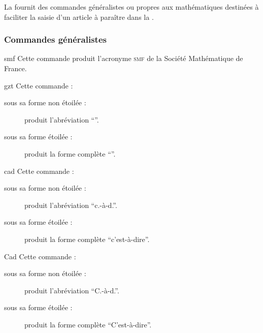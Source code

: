 La \gztauthorcl{} fournit des commandes généralistes ou propres aux
mathématiques destinées à faciliter la saisie d'un article à paraître dans la
\gzt{}.

\subsubsection{Commandes généralistes}
\label{sec:comm-gener}

\begin{docCommand}{smf}{}
  Cette commande produit l'acronyme \textsc{smf} de la Société Mathématique de
  France.
\end{docCommand}

\begin{docCommand}{gzt}{}
  Cette commande :
  \begin{description}
  \item[sous sa forme non étoilée :] produit l'abréviation \enquote{\gzt}.
  \item[sous sa forme étoilée :] produit la forme complète \enquote{\gzt*}.
  \end{description}
\end{docCommand}

\begin{docCommand}{cad}{}
  Cette commande :
  \begin{description}
  \item[sous sa forme non étoilée :] produit l'abréviation \enquote{c.-à-d.}.
  \item[sous sa forme étoilée :] produit la forme complète
    \enquote{c'est-à-dire}.
  \end{description}
\end{docCommand}

\begin{docCommand}{Cad}{}
  Cette commande :
  \begin{description}
  \item[sous sa forme non étoilée :] produit l'abréviation \enquote{C.-à-d.}.
  \item[sous sa forme étoilée :] produit la forme complète
    \enquote{C'est-à-dire}.
  \end{description}
\end{docCommand}

